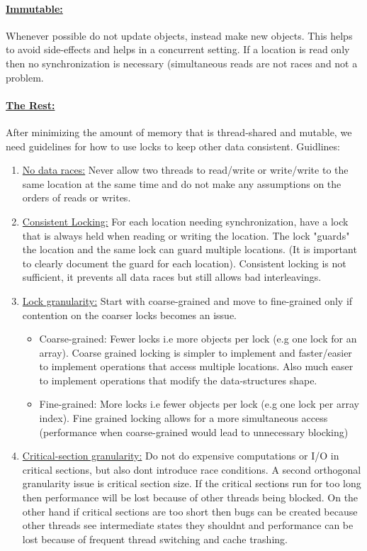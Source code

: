 \documentclass[8pt]{extreport}
\begin{document}
\paragraph{\underline{Immutable:}} Whenever possible do not update objects, instead make new objects. This helps to avoid side-effects and helps in a concurrent setting. If a location is read only then no synchronization is necessary (simultaneous reads are not races and not a problem.
\paragraph{\underline{The Rest:}} After minimizing the amount of memory that is thread-shared and mutable, we need guidelines for how to use locks to keep other data consistent. Guidlines:
\begin{enumerate}
\item \underline{No data races:} Never allow two threads to read/write or write/write to the same location at the same time and do not make any assumptions on the orders of reads or writes.
\item \underline{Consistent Locking:} For each location needing synchronization, have a lock that is always held when reading or writing the location. The lock "guards" the location and the same lock can guard multiple locations. (It is important to clearly document the guard for each location). Consistent locking is not sufficient, it prevents all data races but still allows bad interleavings.
\item \underline{Lock granularity:} Start with coarse-grained and move to fine-grained only if contention on the coarser locks becomes an issue.
\begin{itemize}
\item Coarse-grained: Fewer locks i.e more objects per lock (e.g one lock for an array). Coarse grained locking is simpler to implement and faster/easier to implement operations that access multiple locations. Also much easer to implement operations that modify the data-structures shape.
\item Fine-grained: More locks i.e fewer objects per lock (e.g one lock per array index). Fine grained locking allows for a more simultaneous access (performance when coarse-grained would lead to unnecessary blocking)
\end{itemize}
\item \underline{Critical-section granularity:} Do not do expensive computations or I/O in critical sections, but also dont introduce race conditions. A second orthogonal granularity issue is critical section size. If the critical sections run for too long then performance will be lost because of other threads being blocked. On the other hand if critical sections are too short then bugs can be created because other threads see intermediate states they shouldnt and performance can be lost because of frequent thread switching and cache trashing.

\end{enumerate}
\end{document}
